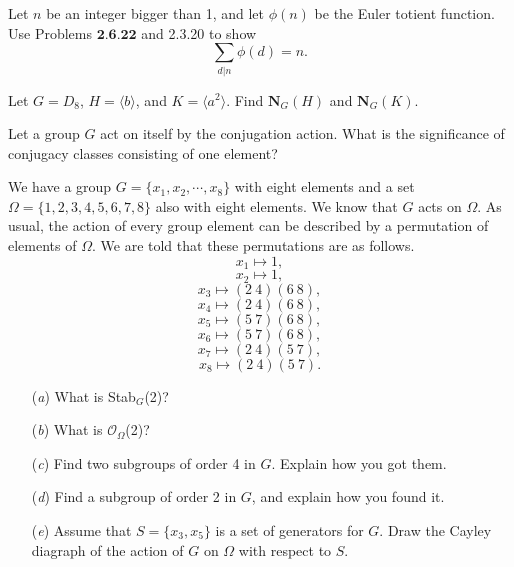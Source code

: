 \documentclass[12pt,letterpaper,boxed]{hmcpset}
\begin{document}

\begin{problem}[2.6.23]
Let $n$ be an integer bigger than 1, and let $\phi(n)$ be the Euler totient function. Use Problems $\textbf{2.6.22}$ and 2.3.20 to show $$ \sum_{d \vert n} \phi(d) = n. $$
\end{problem}

\begin{solution}

\end{solution}

\clearpage

\begin{problem}[4.3.3]
Let $ G = D_8 $, $ H = \langle b \rangle $, and $ K = \langle a^2 \rangle $. Find $ \textbf{N}_G(H) $ and $ \textbf{N}_G(K) $.
\end{problem}

\begin{solution}
\end{solution}

\clearpage

\begin{problem}[4.4.7]
Let a group $G$ act on itself by the conjugation action. What is the significance of conjugacy classes consisting of one element?
\end{problem}

\begin{solution}
\end{solution}

\clearpage


\begin{problem}[4.4.9]
We have a group $ G = \{ x_1,x_2,\cdots,x_8 \} $ with eight elements and a set $\Omega = \{ 1,2,3,4,5,6,7,8 \} $ also with eight elements. We know that $G$ acts on $\Omega$. As usual, the action of every group element can be described by a permutation of elements of $\Omega$. We are told that these permutations are as follows. $$ x_1 \mapsto 1, $$ $$ x_2 \mapsto 1, $$ $$ x_3 \mapsto (2 \ 4)(6 \ 8), $$ $$ x_4 \mapsto (2 \ 4)(6 \ 8), $$ $$ x_5 \mapsto (5 \ 7)(6 \ 8), $$ $$ x_6 \mapsto (5 \ 7)(6 \ 8), $$ $$ x_7 \mapsto (2 \ 4)(5 \ 7), $$ $$ x_8 \mapsto (2 \ 4)(5 \ 7). $$
\begin{itemize}
  \item[(\textit{a})] What is Stab$_G$(2)?
  
  \item[(\textit{b})] What is $ \mathcal{O}_{\Omega} $(2)?
  
  \item[(\textit{c})] Find two subgroups of order 4 in $G$. Explain how you got them. 
  
  \item[(\textit{d})] Find a subgroup of order 2 in $G$, and explain how you found it. 
  
  \item[(\textit{e})] Assume that $ S = \{ x_3,x_5 \} $ is a set of generators for $G$. Draw the Cayley diagraph of the action of $G$ on $\Omega$ with respect to $S$.
\end{itemize}
\end{problem}
\end{document}
